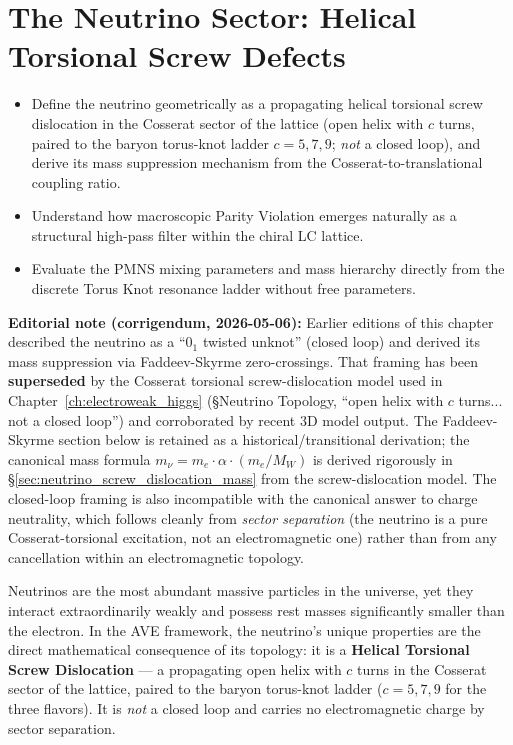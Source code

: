 \chapter{The Neutrino Sector: Helical Torsional Screw Defects}
\label{ch:neutrino_sector}

\begin{objectivebox}
\begin{itemize}
    \item Define the neutrino geometrically as a propagating helical torsional screw dislocation in the Cosserat sector of the lattice (open helix with $c$ turns, paired to the baryon torus-knot ladder $c = 5, 7, 9$; \emph{not} a closed loop), and derive its mass suppression mechanism from the Cosserat-to-translational coupling ratio.
    \item Understand how macroscopic Parity Violation emerges naturally as a structural high-pass filter within the chiral LC lattice.
    \item Evaluate the PMNS mixing parameters and mass hierarchy directly from the discrete Torus Knot resonance ladder without free parameters.
\end{itemize}
\end{objectivebox}

\noindent\textbf{Editorial note (corrigendum, 2026-05-06):} Earlier editions of this chapter described the neutrino as a ``$0_1$ twisted unknot'' (closed loop) and derived its mass suppression via Faddeev-Skyrme zero-crossings. That framing has been \textbf{superseded} by the Cosserat torsional screw-dislocation model used in Chapter~\ref{ch:electroweak_higgs} (\S Neutrino Topology, ``open helix with $c$ turns... not a closed loop'') and corroborated by recent 3D model output. The Faddeev-Skyrme section below is retained as a historical/transitional derivation; the canonical mass formula $m_\nu = m_e \cdot \alpha \cdot (m_e/M_W)$ is derived rigorously in \S\ref{sec:neutrino_screw_dislocation_mass} from the screw-dislocation model. The closed-loop framing is also incompatible with the canonical answer to charge neutrality, which follows cleanly from \emph{sector separation} (the neutrino is a pure Cosserat-torsional excitation, not an electromagnetic one) rather than from any cancellation within an electromagnetic topology.

Neutrinos are the most abundant massive particles in the universe, yet they interact extraordinarily weakly and possess rest masses significantly smaller than the electron. In the AVE framework, the neutrino's unique properties are the direct mathematical consequence of its topology: it is a \textbf{Helical Torsional Screw Dislocation} --- a propagating open helix with $c$ turns in the Cosserat sector of the lattice, paired to the baryon torus-knot ladder ($c = 5, 7, 9$ for the three flavors). It is \emph{not} a closed loop and carries no electromagnetic charge by sector separation.

